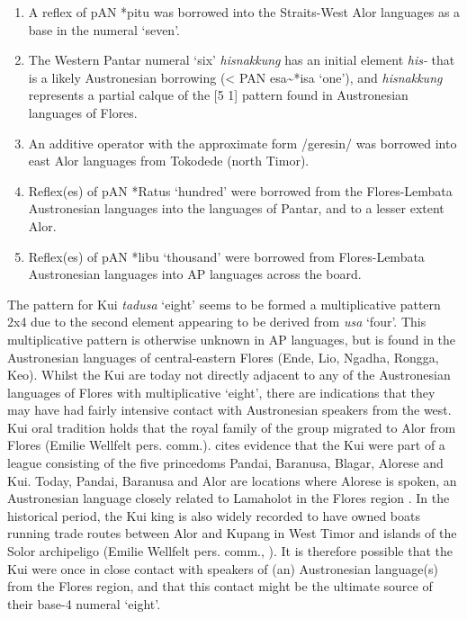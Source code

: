 \documentclass[output=paper]{LSP/langsci}
\begin{document}
\begin{enumerate}
\item A reflex of pAN *pitu was borrowed into the Straits-West Alor languages as a base in the numeral `seven'. 

\item The Western Pantar numeral `six' \textit{hisnakkung} has an initial element \textit{his-} that is a likely Austronesian borrowing ({\textless} PAN esa\~{}*isa `one'), and \textit{hisnakkung} represents a partial calque of the [5 1] pattern found in Austronesian languages of Flores. 

\item An additive operator with the approximate form /geresin/ was borrowed into east Alor languages from Tokodede (north Timor). 

\item Reflex(es) of pAN *Ratus `hundred' were borrowed from the Flores-Lembata Austronesian languages into the languages of Pantar, and to a lesser extent Alor.

\item Reflex(es) of pAN *libu `thousand' were borrowed from Flores-Lembata Austronesian languages into AP languages across the board.  


\end{enumerate}
  The pattern for Kui \textit{tadusa} `eight' seems to be formed a multiplicative pattern 2x4 due to the second element appearing to be derived from \textit{usa} `four'. This multiplicative pattern is otherwise unknown in AP languages, but is found in the Austronesian languages of central-eastern Flores (Ende, Lio, Ngadha, Rongga, Keo). Whilst the Kui are today not directly adjacent to any of the Austronesian languages of Flores with multiplicative `eight', there are indications that they may have had fairly intensive contact with Austronesian speakers from the west. Kui oral tradition holds that the royal family of the group migrated to Alor from Flores (Emilie Wellfelt pers. comm.). \citet[38, fn. 36]{Hagerdal2012} cites evidence that the Kui were part of a league consisting of the five princedoms Pandai, Baranusa, Blagar, Alorese and Kui. Today, Pandai, Baranusa and Alor are locations where Alorese is spoken, an Austronesian language closely related to Lamaholot in the Flores region \citep{Klamer2011,Klamer2012}. In the historical period, the Kui king is also widely recorded to have owned boats running trade routes between Alor and Kupang in West Timor and islands of the Solor archipeligo (Emilie Wellfelt pers. comm., \citet{Hagerdal2012}). It is therefore possible that the Kui were once in close contact with speakers of (an) Austronesian language(s) from the Flores region, and that this contact might be the ultimate source of their base-4 numeral `eight'.
\end{document}
